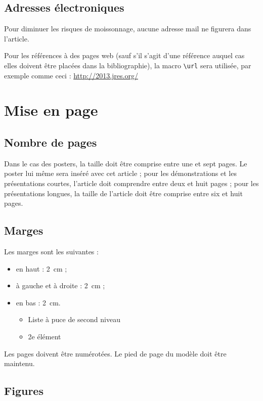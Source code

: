 \documentclass[city=Montpellier,year=2013]{jres}
\begin{document}
\subsection{Adresses électroniques}

Pour diminuer les risques de moissonnage, aucune adresse mail ne
figurera dans l'article. 

Pour les références à des pages web (sauf s'il s'agit d'une référence
auquel cas elles doivent être placées dans la bibliographie), la macro
\verb|\url| sera utilisée, par exemple comme ceci : \url{http://2013.jres.org/}

\section{Mise en page}

\subsection{Nombre de pages}

Dans le cas des posters, la taille doit être comprise entre une et
sept pages. Le poster lui même sera inséré avec cet article ; pour les
démonstrations et les présentations courtes, l'article doit comprendre
entre deux et huit pages ; pour les présentations longues, la taille
de l'article doit être comprise entre six et huit pages.

\subsection{Marges}

Les marges sont les suivantes :

\begin{itemize}
    \item en haut : 2\ cm ;
    \item à gauche et à droite : 2\ cm ;
    \item en bas : 2\ cm.
	\begin{itemize}
	    \item Liste à puce de second niveau
	    \item 2e élément
	\end{itemize}
\end{itemize}

Les pages doivent être numérotées. Le pied de page du modèle doit être
maintenu.

\subsection{Figures}
\end{document}
